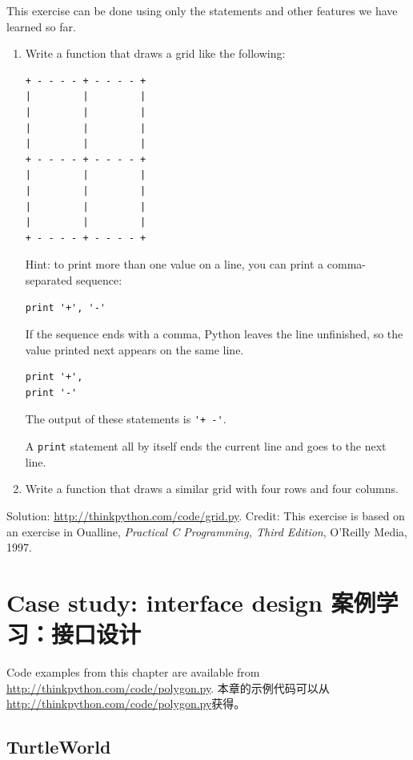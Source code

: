 \documentclass[10pt]{book}
\begin{document}
\begin{CJK}{UTF8}{gbsn}
\begin{exercise}
This exercise can be
done using only the statements and other features we have learned so
far.  

\begin{enumerate}

\item Write a function that draws a grid like the following:

\begin{verbatim}
+ - - - - + - - - - +
|         |         |
|         |         |
|         |         |
|         |         |
+ - - - - + - - - - +
|         |         |
|         |         |
|         |         |
|         |         |
+ - - - - + - - - - +
\end{verbatim}
%
Hint: to print more than one value on a line, you can print
a comma-separated sequence:

\begin{verbatim}
print '+', '-'
\end{verbatim}
%
If the sequence ends with a comma, Python leaves the line unfinished,
so the value printed next appears on the same line.

\begin{verbatim}
print '+', 
print '-'
\end{verbatim}
%
The output of these statements is \verb"'+ -'".

A {\tt print} statement all by itself ends the current line and
goes to the next line.

\item Write a function that draws a similar grid
with four rows and four columns.

\end{enumerate}

Solution: \url{http://thinkpython.com/code/grid.py}.
Credit: This exercise is based on an exercise in Oualline, {\em
    Practical C Programming, Third Edition}, O'Reilly Media, 1997.
\end{exercise}
\chapter{Case study: interface design 案例学习：接口设计}
\label{turtlechap}
Code examples from this chapter are available from
\url{http://thinkpython.com/code/polygon.py}.
本章的示例代码可以从\url{http://thinkpython.com/code/polygon.py}获得。
\section{TurtleWorld}


\end{CJK}
\end{document}
